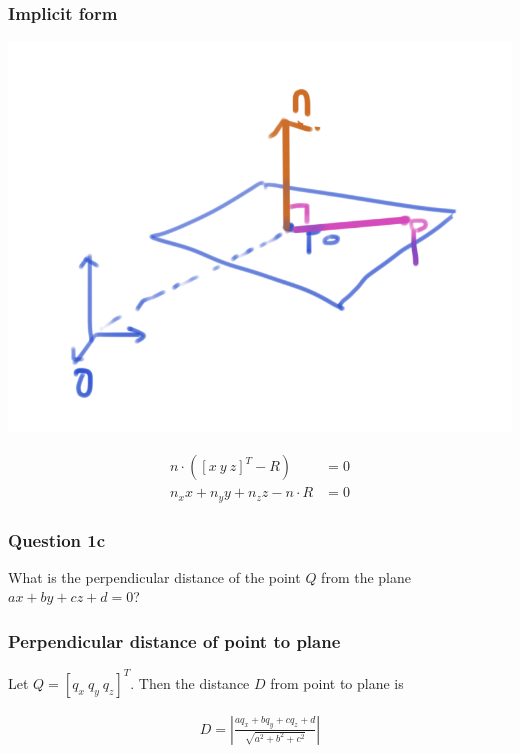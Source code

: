 \documentclass{beamer}
\begin{document}
\begin{frame}
    \frametitle{Implicit form}

    \begin{center}
        \includegraphics[scale=0.4]{plane-def.png}

        \begin{eqnarray}
            n \cdot ([x \  y \  z]^T - R) &= 0 \\ 
            n_x x + n_y y + n_z z - n\cdot R &= 0
        \end{eqnarray}
    \end{center}

\end{frame}

\begin{frame}
    \frametitle{Question 1c}
    
    What is the perpendicular distance of the point $Q$ from the plane $ax + by + cz + d = 0$?

\end{frame}

\begin{frame}
    \frametitle{Perpendicular distance of point to plane}

    Let $Q = [q_x \  q_y \  q_z]^T$. Then the distance $D$ from point to plane is 

    \begin{eqnarray}
        D = \left| \frac{aq_x + bq_y + cq_z + d}{\sqrt{a^2 + b^2 + c^2}}\right|
    \end{eqnarray}

\end{frame}
\end{document}

